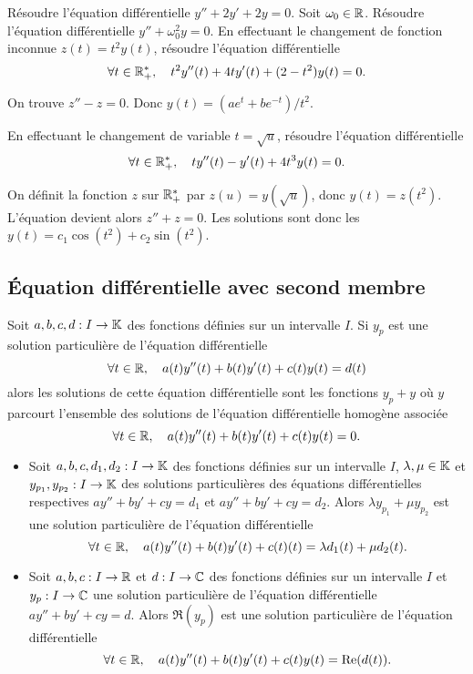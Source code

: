 \documentclass{magnolia}
\begin{document}
\begin{exos}
\exo Résoudre l'équation différentielle $y''+2y'+2y=0$.
\exo Soit $\omega_0\in\mathbb{R}$. Résoudre l'équation différentielle
  $y''+\omega_0^2 y=0$.
\exo En effectuant le changement de fonction inconnue $z(t)=t^2 y(t)$,
  résoudre l'équation différentielle
  \[\forall t\in\mathbb{R}_+^* ,\quad t^2 y''(t)+4ty'(t)+(2-t^2)y(t)=0.\]
  \begin{sol}
  On trouve $z''-z=0$. Donc $y(t)=(ae^t+be^{-t})/t^2$.
  \end{sol}
\exo En effectuant le changement de variable $t=\sqrt{u}$, résoudre
  l'équation différentielle
  \[\forall t\in\mathbb{R}_+^* ,\quad ty''(t)-y'(t)+4t^3y(t)=0.\]
  \begin{sol}
  On définit la fonction $z$ sur $\mathbb{R}_+^*$ par $z(u)=y(\sqrt{u})$, donc
  $y(t)=z(t^2)$. L'équation devient alors $z''+z=0$. Les solutions sont donc
  les $y(t)=c_1\cos(t^2)+c_2\sin(t^2)$.
  \end{sol}
\end{exos}

\subsection{Équation différentielle avec second membre}

\begin{proposition}[utile=-3,nom={Théorème de superposition}]
Soit $a,b,c,d:I\to\mathbb{K}$ des fonctions définies sur un intervalle $I$.
Si $y_p$ est une solution \og particulière \fg de l'équation différentielle
\[\forall t\in\mathbb{R} ,\quad a(t)y''(t)+b(t)y'(t)+c(t)y(t)=d(t)\]
alors les solutions de cette équation différentielle sont les fonctions $y_p+y$
où $y$ parcourt l'ensemble des solutions de l'équation différentielle homogène
associée
\[\forall t\in\mathbb{R} ,\quad a(t)y''(t)+b(t)y'(t)+c(t)y(t)=0.\]
\end{proposition}


\begin{proposition}[utile=-3,nom={Théorème de superposition}]
\begin{itemize}
\item Soit $a,b,c,d_1,d_2:I\to\mathbb{K}$ des fonctions définies sur un intervalle $I$, $\lambda,\mu\in\mathbb{K}$ et $y_{p_1},y_{p_2}:I\to\mathbb{K}$ des solutions \og particulières \fg des équations
  différentielles respectives $ay''+by'+cy=d_1$ et $ay''+by'+cy=d_2$. Alors
  $\lambda y_{p_1}+\mu y_{p_2}$ est une solution \og particulière \fg de l'équation différentielle
  \[\forall t\in\mathbb{R} ,\quad a(t)y''(t)+b(t)y'(t)+c(t)(t)=
    \lambda d_1(t)+\mu d_2(t).\]
\item Soit $a,b,c:I\to\mathbb{R}$ et $d:I\to\mathbb{C}$ des fonctions définies sur un intervalle $I$ et $y_p:I\to\mathbb{C}$ une solution
  \og particulière \fg de l'équation différentielle $ay''+by'+cy=d$. Alors
  $\Re(y_p)$ est une solution \og particulière \fg de l'équation différentielle
  \[\forall t\in \mathbb{R} ,\quad a(t)y''(t)+b(t)y'(t)+c(t)y(t)=\mathop{\rm Re}(d(t)).\]
\end{itemize}
\end{proposition}
\end{document}
